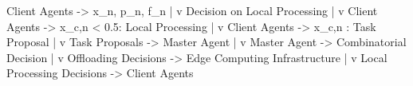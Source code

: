 Client Agents -> {x_{n}, p_n, f_{n}}
                |
                v
Decision on Local Processing
                |
                v
Client Agents -> {x_{c,n} < 0.5: Local Processing}
                |
                v
Client Agents -> {x_{c,n} : Task Proposal}
                |
                v
Task Proposals -> Master Agent
                |
                v
Master Agent -> Combinatorial Decision
                |
                v
Offloading Decisions -> Edge Computing Infrastructure
                |
                v
Local Processing Decisions -> Client Agents